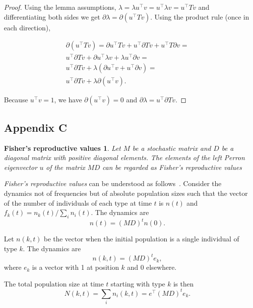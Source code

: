 \documentclass[9pt, a4paper, twocolumn]{extarticle}
\newcommand*{\tr}{^\intercal}
\newtheorem*{frv}{Fisher's reproductive values}
\begin{document}
\begin{proof} 
Using the lemma assumptions,
$\lambda = \lambda u\tr v = u\tr \lambda v = u\tr T v$ and differentiating both sides we get $\partial \lambda = \partial (u\tr T v)$.
Using the product rule (once in each direction),

\begin{multline}
\partial (u\tr T v) = 
\partial u\tr T v + u\tr \partial T v + u\tr T \partial v = \\
u\tr \partial T v + \partial u\tr \lambda v  + \lambda u\tr \partial v = \\
u\tr \partial T v + \lambda(\partial u\tr v  + u\tr \partial v) = \\
u\tr \partial T v + \lambda \partial(u\tr v).
\end{multline}

Because $u\tr v = 1$,
we have $\partial (u\tr v) = 0$ and
$\partial \lambda = u\tr \partial T v$.
\end{proof}

\subsection*{Appendix C}\label{sec:AppC}
\begin{frv}
Let $M$ be a stochastic matrix and $D$ be a diagonal matrix with positive diagonal elements. 
The elements of the left \emph{Perron} eigenvector $u$ of the matrix $MD$ can be regarded as \emph{Fisher's reproductive values}~\citep[pg.~27]{Fisher1930}
\end{frv}

\emph{Fisher's reproductive values} can be understood as follows~\citep{Grafen2006}.
Consider the dynamics not of frequencies but of absolute population sizes such that the vector of the number of individuals of each type at time $t$ is $n(t)$ and $f_k(t) = n_k(t) / \sum_i{n_i(t)}$.
The dynamics are
\begin{equation}
n(t) = (MD)^t n(0).
\end{equation}

Let $n(k, t)$ be the vector when the initial population is a single individual of type $k$.
The dynamics are
\begin{equation}
n(k,t) = (MD)^t e_k,
\end{equation}
where $e_k$ is a vector with 1 at position $k$ and 0 elsewhere.

The total population size at time $t$ starting with type $k$ is then
\begin{equation}
N(k,t) = \sum_i{n_i(k,t)} = e\tr (MD)^t e_k.
\end{equation}
\end{document}
